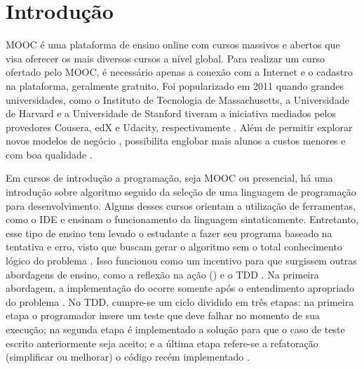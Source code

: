 \chapter{Introdução}

\ac{MOOC} é uma plataforma de ensino online
com cursos massivos e abertos que visa oferecer os mais diversos cursos a nível
global. Para realizar um curso ofertado pelo \acs{MOOC}, é necessário apenas a conexão
com a Internet e o cadastro na plataforma, geralmente gratuito. Foi popularizado
em 2011 quando grandes universidades, como o Instituto de Tecnologia de
Massachusetts, a Universidade de Harvard e a Universidade de Stanford tiveram
a iniciativa mediados pelos provedores Cousera, edX e Udacity, respectivamente
\cite{Mehlenbacher:2012}. Além de permitir explorar novos modelos de negócio
\cite{dellarocas2013money}, possibilita englobar mais alunos a custos menores
e com boa qualidade \cite{schmidt2013producing}.
	
Em cursos de introdução a programação, seja \acs{MOOC} ou presencial, há uma introdução
sobre algoritmo seguido da seleção de uma linguagem de programação para
desenvolvimento. Alguns desses cursos orientam a utilização de ferramentas, como
o \ac{IDE} e ensinam o funcionamento da linguagem sintaticamente.
Entretanto, esse tipo de ensino tem levado o estudante a fazer seu programa baseado
na tentativa e erro, visto que buscam gerar o algoritmo sem o total conhecimento
lógico do problema \cite{edwards2003}. Isso funcionou como um incentivo para que
surgissem outras abordagens de ensino, como a reflexão na ação () e o \ac{TDD} \cite{camara_graciottoSilva2016}. Na primeira abordagem, a
implementação do  ocorre somente após o entendimento apropriado
do problema \cite{edwards2004}. No \acs{TDD}, cumpre-se um ciclo dividido em três etapas:
na primeira etapa o programador insere um teste que deve falhar no momento de sua
execução; na segunda etapa é implementado a solução para que o caso de teste
escrito anteriormente seja aceito; e a última etapa refere-se a refatoração
(simplificar ou melhorar) o código recém implementado \cite{beck2003}.